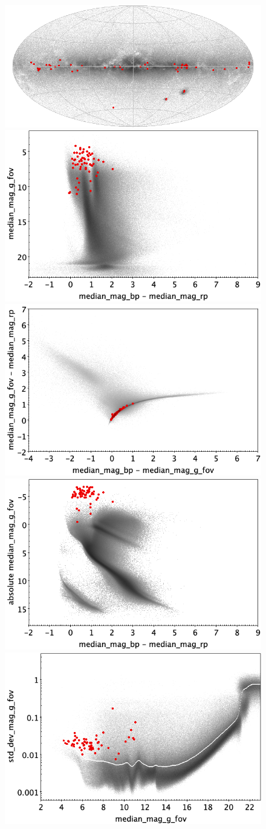 \documentclass[longauth]{aa}
\begin{document}
\begin{appendix}
\begin{figure}
\centering
{} \includegraphics[width=0.6\hsize]{figures/appendix/ACYG_trn_sky.png} \\ %
\vspace{4mm}
 \includegraphics[width=0.45\hsize]{figures/appendix/ACYG_trn_cm.png}  %
\hspace{2mm}
 \includegraphics[width=0.45\hsize]{figures/appendix/ACYG_trn_cc.png} \\ %
\vspace{4mm}
 \includegraphics[width=0.45\hsize]{figures/appendix/ACYG_trn_cam.png}  %
\hspace{2mm}
 \includegraphics[width=0.45\hsize]{figures/appendix/ACYG_trn_msd.png} \\ %

\end{figure}
\end{appendix}
\end{document}
